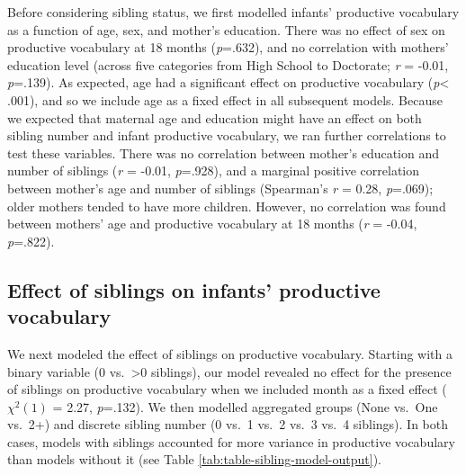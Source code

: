 \documentclass[
  english,
  man,floatsintext]{apa6}
\begin{document}
Before considering sibling status, we first modelled infants' productive vocabulary as a function of age, sex, and mother's education. There was no effect of sex on productive vocabulary at 18 months (\emph{p}=.632), and no correlation with mothers' education level (across five categories from High School to Doctorate; \emph{r} = -0.01, \emph{p}=.139). As expected, age had a significant effect on productive vocabulary (\emph{p}\textless{} .001), and so we include age as a fixed effect in all subsequent models. Because we expected that maternal age and education might have an effect on both sibling number and infant productive vocabulary, we ran further correlations to test these variables. There was no correlation between mother's education and number of siblings (\emph{r} = -0.01, \emph{p}=.928), and a marginal positive correlation between mother's age and number of siblings (Spearman's \emph{r} = 0.28, \emph{p}=.069); older mothers tended to have more children. However, no correlation was found between mothers' age and productive vocabulary at 18 months (\emph{r} = -0.04, \emph{p}=.822).

\hypertarget{effect-of-siblings-on-infants-productive-vocabulary}{%
\subsection{Effect of siblings on infants' productive vocabulary}\label{effect-of-siblings-on-infants-productive-vocabulary}}

We next modeled the effect of siblings on productive vocabulary. Starting with a binary variable (0 vs.~\textgreater0 siblings), our model revealed no effect for the presence of siblings on productive vocabulary when we included month as a fixed effect (\(\chi^2 (1)\) = 2.27, \emph{p}=.132). We then modelled aggregated groups (None vs.~One vs.~2+) and discrete sibling number (0 vs.~1 vs.~2 vs.~3 vs.~4 siblings). In both cases, models with siblings accounted for more variance in productive vocabulary than models without it (see Table \ref{tab:table-sibling-model-output}).
\end{document}
